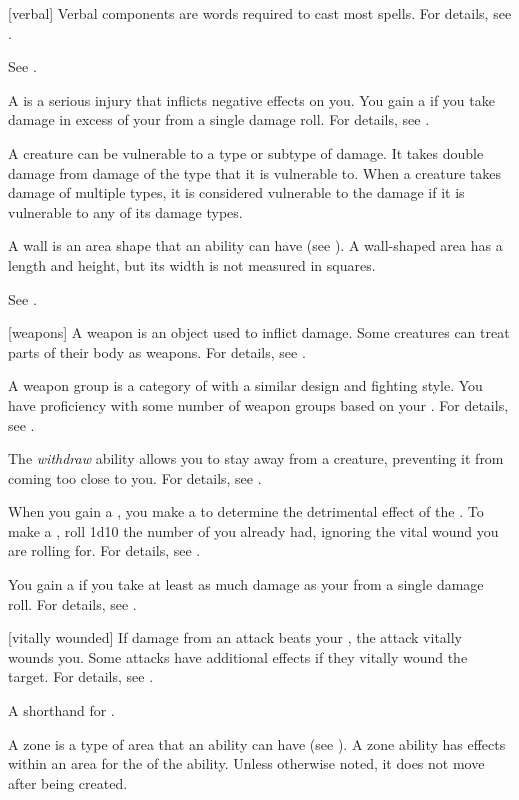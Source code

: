 [verbal] Verbal components are words required to cast most spells.
For details, see .

 See .

 A  is a serious injury that inflicts negative effects on you.
You gain a  if you take damage in excess of your  from a single damage roll.
For details, see .

 A creature can be vulnerable to a type or subtype of damage.
It takes double damage from damage of the type that it is vulnerable to.
When a creature takes damage of multiple types, it is considered vulnerable to the damage if it is vulnerable to any of its damage types.

 A wall is an area shape that an ability can have (see ).
A wall-shaped area has a length and height, but its width is not measured in squares.

 See .

[weapons] A weapon is an object used to inflict damage.
Some creatures can treat parts of their body as weapons.
For details, see .

 A weapon group is a category of  with a similar design and fighting style.
You have proficiency with some number of weapon groups based on your .
For details, see .

 The \textit{withdraw} ability allows you to stay away from a creature, preventing it from coming too close to you.
For details, see .

 When you gain a , you make a  to determine the detrimental effect of the .
To make a , roll 1d10 \sub the number of  you already had, ignoring the vital wound you are rolling for.
For details, see .

 You gain a  if you take at least as much damage as your  from a single damage roll.
For details, see .

[vitally wounded] If damage from an attack beats your , the attack vitally wounds you.
Some attacks have additional effects if they vitally wound the target.
For details, see .

 A shorthand for .

 A zone is a type of area that an ability can have (see ).
A zone ability has effects within an area for the  of the ability.
Unless otherwise noted, it does not move after being created.
